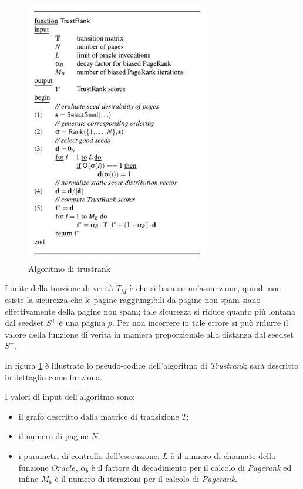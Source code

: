 \begin{figure}
\centering
\includegraphics[width=8cm]{immagini/trustrank/trustrank}
\caption{Algoritmo di trustrank}
\label{fig:trustrank1}
\end{figure}
Limite della funzione di verità \(T_M\) è che si basa su un'assunzione, quindi non esiste la sicurezza che le pagine raggiungibili da pagine non spam siano effettivamente della pagine non spam; tale sicurezza si riduce quanto più lontana dal seedset \(S^+\) è una pagina \(p\). Per non incorrere in tale errore si può ridurre il valore della funzione di verità in maniera proporzionale alla distanza dal seedset \(S^+\).

In figura \ref{fig:trustrank1} è illustrato lo pseudo-codice dell'algoritmo di \textit{Trustrank}; sarà descritto in dettaglio come funziona. 

I valori di input dell'algoritmo sono:
\begin{itemize}
 \item il grafo descritto dalla matrice di transizione \(T\);
 \item il numero di pagine \(N\);
 \item i parametri di controllo dell'esecuzione: \(L\) è il numero di chiamate della funzione \(Oracle\), \(\alpha_b\) è il fattore di decadimento per il calcolo di \textit{Pagerank} ed infine \(M_b\) è il numero di iterazioni per il calcolo di \textit{Pagerank}.
\end{itemize}

